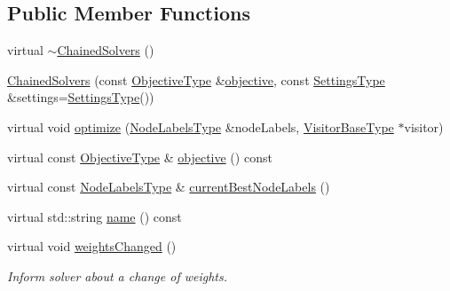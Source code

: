 \subsection*{Public Member Functions}
\begin{DoxyCompactItemize}
\item 
virtual \hyperlink{classnifty_1_1graph_1_1opt_1_1lifted__multicut_1_1ChainedSolvers_a482d575e6bbcfe44ee2612866b74b6f8}{$\sim$\+Chained\+Solvers} ()
\item 
\hyperlink{classnifty_1_1graph_1_1opt_1_1lifted__multicut_1_1ChainedSolvers_a78a607b629a3e52a8f963fdd58147ae8}{Chained\+Solvers} (const \hyperlink{classnifty_1_1graph_1_1opt_1_1lifted__multicut_1_1ChainedSolvers_a59b16a41f7cc3aa24888584899f118e8}{Objective\+Type} \&\hyperlink{classnifty_1_1graph_1_1opt_1_1lifted__multicut_1_1ChainedSolvers_a858016455b3b77d9757a96a891a44d92}{objective}, const \hyperlink{structnifty_1_1graph_1_1opt_1_1lifted__multicut_1_1ChainedSolvers_1_1SettingsType}{Settings\+Type} \&settings=\hyperlink{structnifty_1_1graph_1_1opt_1_1lifted__multicut_1_1ChainedSolvers_1_1SettingsType}{Settings\+Type}())
\item 
virtual void \hyperlink{classnifty_1_1graph_1_1opt_1_1lifted__multicut_1_1ChainedSolvers_a83025589cc3708c2f923c2d073560b00}{optimize} (\hyperlink{classnifty_1_1graph_1_1opt_1_1lifted__multicut_1_1ChainedSolvers_a8c2130c9b1a596d14098018c54b8f976}{Node\+Labels\+Type} \&node\+Labels, \hyperlink{classnifty_1_1graph_1_1opt_1_1lifted__multicut_1_1ChainedSolvers_ac33a800e2d3542a35679d01a334e1751}{Visitor\+Base\+Type} $\ast$visitor)
\item 
virtual const \hyperlink{classnifty_1_1graph_1_1opt_1_1lifted__multicut_1_1ChainedSolvers_a59b16a41f7cc3aa24888584899f118e8}{Objective\+Type} \& \hyperlink{classnifty_1_1graph_1_1opt_1_1lifted__multicut_1_1ChainedSolvers_a858016455b3b77d9757a96a891a44d92}{objective} () const
\item 
virtual const \hyperlink{classnifty_1_1graph_1_1opt_1_1lifted__multicut_1_1ChainedSolvers_a8c2130c9b1a596d14098018c54b8f976}{Node\+Labels\+Type} \& \hyperlink{classnifty_1_1graph_1_1opt_1_1lifted__multicut_1_1ChainedSolvers_a6c0b64e2271d19a8b8a10aebf390b530}{current\+Best\+Node\+Labels} ()
\item 
virtual std\+::string \hyperlink{classnifty_1_1graph_1_1opt_1_1lifted__multicut_1_1ChainedSolvers_af1a1069a6d390a04f9ac547600ea09e3}{name} () const
\item 
virtual void \hyperlink{classnifty_1_1graph_1_1opt_1_1lifted__multicut_1_1ChainedSolvers_a68158bd1f3cf0198769e52635989b9b6}{weights\+Changed} ()
\begin{DoxyCompactList}\small\item\em Inform solver about a change of weights. \end{DoxyCompactList}\end{DoxyCompactItemize}


